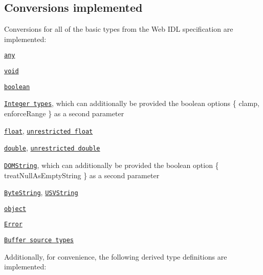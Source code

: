 \subsection*{Conversions implemented}

Conversions for all of the basic types from the Web I\+DL specification are implemented\+:


\begin{DoxyItemize}
\item \href{https://heycam.github.io/webidl/#es-any}{\tt {\ttfamily any}}
\item \href{https://heycam.github.io/webidl/#es-void}{\tt {\ttfamily void}}
\item \href{https://heycam.github.io/webidl/#es-boolean}{\tt {\ttfamily boolean}}
\item \href{https://heycam.github.io/webidl/#es-integer-types}{\tt Integer types}, which can additionally be provided the boolean options {\ttfamily \{ clamp, enforce\+Range \}} as a second parameter
\item \href{https://heycam.github.io/webidl/#es-float}{\tt {\ttfamily float}}, \href{https://heycam.github.io/webidl/#es-unrestricted-float}{\tt {\ttfamily unrestricted float}}
\item \href{https://heycam.github.io/webidl/#es-double}{\tt {\ttfamily double}}, \href{https://heycam.github.io/webidl/#es-unrestricted-double}{\tt {\ttfamily unrestricted double}}
\item \href{https://heycam.github.io/webidl/#es-DOMString}{\tt {\ttfamily D\+O\+M\+String}}, which can additionally be provided the boolean option {\ttfamily \{ treat\+Null\+As\+Empty\+String \}} as a second parameter
\item \href{https://heycam.github.io/webidl/#es-ByteString}{\tt {\ttfamily Byte\+String}}, \href{https://heycam.github.io/webidl/#es-USVString}{\tt {\ttfamily U\+S\+V\+String}}
\item \href{https://heycam.github.io/webidl/#es-object}{\tt {\ttfamily object}}
\item \href{https://heycam.github.io/webidl/#es-Error}{\tt {\ttfamily Error}}
\item \href{https://heycam.github.io/webidl/#es-buffer-source-types}{\tt Buffer source types}
\end{DoxyItemize}

Additionally, for convenience, the following derived type definitions are implemented\+:


